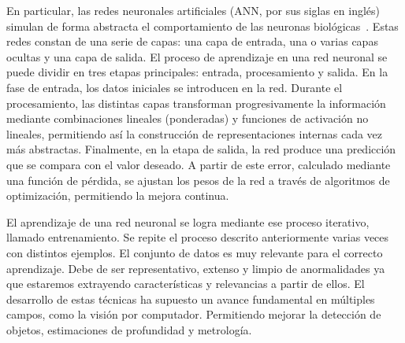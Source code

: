 En particular, las redes neuronales artificiales (ANN, por sus siglas en inglés) simulan de forma abstracta el comportamiento
de las neuronas biológicas~\cite{ANNForPattern, ANNCambridge}. Estas redes constan de una serie de capas: una capa de entrada,
una o varias capas ocultas y una capa de salida. El proceso de aprendizaje en una red neuronal se puede dividir en tres etapas
principales: entrada, procesamiento y salida. En la fase de entrada, los datos iniciales se introducen en la red.
Durante el procesamiento, las distintas capas transforman progresivamente la información mediante combinaciones lineales (ponderadas)
y funciones de activación no lineales, permitiendo así la construcción de representaciones internas cada vez más abstractas.
Finalmente, en la etapa de salida, la red produce una predicción que se compara con el valor deseado.
A partir de este error, calculado mediante una función de pérdida, se ajustan los pesos de la red a través de
algoritmos de optimización, permitiendo la mejora continua.
\par

El aprendizaje de una red neuronal se logra mediante ese proceso iterativo, llamado entrenamiento.
Se repite el proceso descrito anteriormente varias veces con distintos ejemplos. El conjunto de datos es muy relevante para el correcto
aprendizaje. Debe de ser representativo, extenso y limpio de anormalidades ya que estaremos extrayendo características
y relevancias a partir de ellos. El desarrollo de estas técnicas ha supuesto un avance fundamental en múltiples campos, como la
visión por computador. Permitiendo mejorar la detección de objetos, estimaciones de profundidad y metrología.
